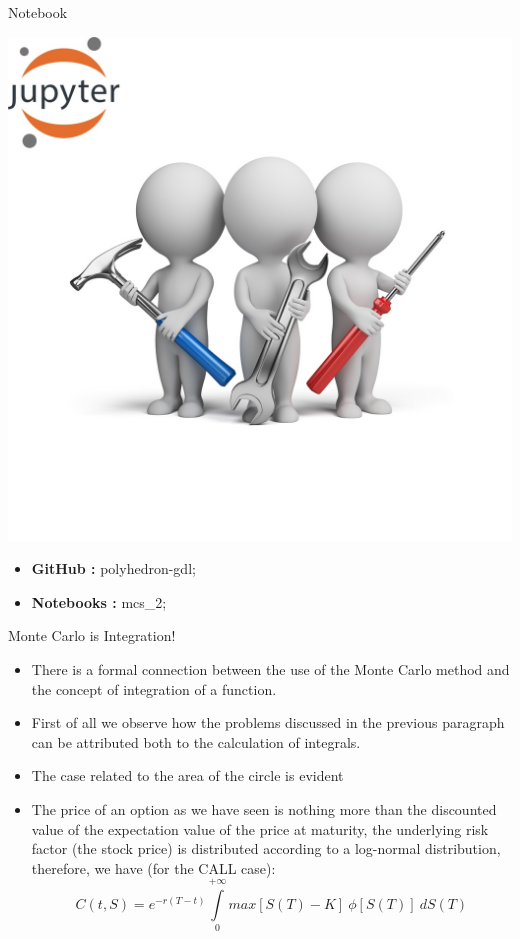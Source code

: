 \documentclass[11pt]{beamer}
\begin{document}
\begin{frame}{Notebook}
\noindent\begin{minipage}{0.5\textwidth}%
\includegraphics[width=\linewidth]{img/exercise.jpg}
\end{minipage}%
\hfill%
\begin{minipage}{0.5\textwidth}
\begin{itemize}
\item {\bf GitHub        : }    polyhedron-gdl;
\item {\bf Notebooks  : }    mcs\_2;
\end{itemize}
\end{minipage}
\end{frame}
\begin{frame}{Monte Carlo is Integration!}
\begin{itemize}
\item There is a formal connection between the use of the Monte Carlo method and the concept of integration of a function. 
\item First of all we observe how the problems discussed in the previous paragraph can be attributed both to the calculation of integrals. 
\item The case related to the area of the circle is evident  
\item The price of an option as we have seen is nothing more than the discounted value of the expectation value of the price at maturity, the underlying risk factor (the stock price) is distributed according to a log-normal distribution, therefore, we have (for the CALL case):
$$C(t,S) =
e^{-r(T-t)}
\int\limits_0^{+\infty}
max[S(T)-K] \> \phi[S(T)] \> dS(T)
$$
\normalsize
\end{itemize}
\end{frame}
\end{document}
